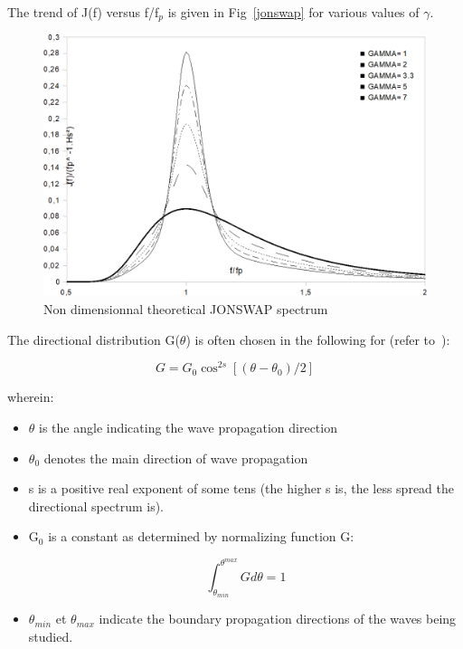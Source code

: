 The trend of J(f) versus f/f${}_{p}$ is given in Fig~\ref{jonswap} for various values of $\gamma$.


\begin{figure}[H]%
\begin{center}
%
  \includegraphics[width=\textwidth]{./graphics/jonswap}
%
\caption{Non dimensionnal theoretical JONSWAP spectrum}\label{fig:jonswap}
\end{center}
\end{figure}

The directional distribution G($\theta$) is often chosen in the following for
(refer to~\cite{Goda2000}):


\begin{equation}
  G = G_0 \cos^{2s}[(\theta-\theta_0)/2]
  \label{eq:3.65}
\end{equation}

wherein:
\begin{itemize}
  \item $\theta$ is the angle indicating the wave propagation direction

  \item $\theta_{0}$ denotes the main direction of wave propagation

  \item s is a positive real exponent of some tens (the higher s is, the less
    spread the directional spectrum is).

  \item G${}_{0}$ is a constant as determined by normalizing function G:

    \[ \int_{\theta_{min}}^{\theta^{max}}Gd\theta = 1  \]

  \item $\theta_{min}$ et $\theta_{max}$ indicate the boundary propagation
    directions of the waves being studied.

\end{itemize}

